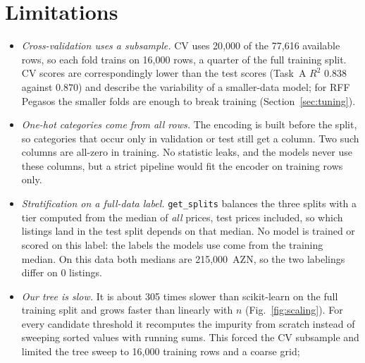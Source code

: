 \documentclass[10pt,twocolumn,a4paper]{article}
\begin{document}
\section{Limitations}
\label{sec:limits}
\begin{itemize}
  \item \textit{Cross-validation uses a subsample.} CV uses 20{,}000 %
  of the 77{,}616 available rows, %
  so each fold trains on 16{,}000 rows, %
  a quarter of the full training split. CV scores are
  correspondingly lower than the test scores (Task~A $R^2$ $0.838$ %
  against $0.870$) %
  and describe the variability of a smaller-data model; for RFF Pegasos
  the smaller folds are enough to break training (Section~\ref{sec:tuning}).
  \item \textit{One-hot categories come from all rows.} The encoding is
  built before the split, so categories that occur only in validation or
  test still get a column. Two such columns are all-zero in training. %
  No statistic leaks, and the models never use these columns, but a
  strict pipeline would fit the encoder on training rows only.
  \item \textit{Stratification on a full-data label.} \texttt{get\_splits}
  balances the three splits with a tier computed from the median of
  \emph{all} prices, test prices included, so which listings land in the
  test split depends on that median. %
  No model is trained or scored on this label: the labels the models use
  come from the training median. On this data both medians are
  215{,}000~AZN, %
  so the two labelings differ on 0 listings. %
  \item \textit{Our tree is slow.} It is about 305 times slower than %
  scikit-learn on the full training split and grows faster than
  linearly with $n$ (Fig.~\ref{fig:scaling}). For every candidate
  threshold it recomputes the impurity from scratch instead of sweeping
  sorted values with running sums. This forced the CV subsample and
  limited the tree sweep to 16{,}000 training rows and a coarse grid; %

\end{itemize}
\end{document}
